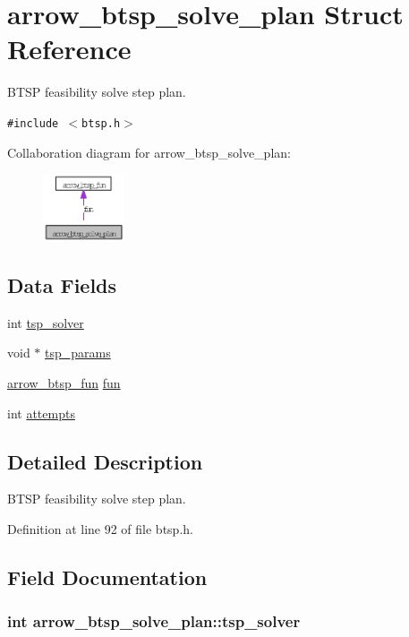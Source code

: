 \hypertarget{structarrow__btsp__solve__plan}{
\section{arrow\_\-btsp\_\-solve\_\-plan Struct Reference}
\label{structarrow__btsp__solve__plan}
}
BTSP feasibility solve step plan.  


{\tt \#include $<$btsp.h$>$}

Collaboration diagram for arrow\_\-btsp\_\-solve\_\-plan:\nopagebreak
\begin{figure}[H]
\begin{center}
\leavevmode
\includegraphics[width=68pt]{structarrow__btsp__solve__plan__coll__graph}
\end{center}
\end{figure}
\subsection*{Data Fields}
\begin{CompactItemize}
\item 
int \hyperlink{structarrow__btsp__solve__plan_911facf12673ddb5c3eb024fa12ee18d}{tsp\_\-solver}
\item 
void $\ast$ \hyperlink{structarrow__btsp__solve__plan_2b7cf65583f45c990218139dbae34ae5}{tsp\_\-params}
\item 
\hyperlink{structarrow__btsp__fun}{arrow\_\-btsp\_\-fun} \hyperlink{structarrow__btsp__solve__plan_89fa2ad1bcc026cd50fd7abc6c30ce3e}{fun}
\item 
int \hyperlink{structarrow__btsp__solve__plan_acfa3d4257a33548a9f60ee568219bc5}{attempts}
\end{CompactItemize}


\subsection{Detailed Description}
BTSP feasibility solve step plan. 

Definition at line 92 of file btsp.h.

\subsection{Field Documentation}
\hypertarget{structarrow__btsp__solve__plan_911facf12673ddb5c3eb024fa12ee18d}{
\subsubsection{\setlength{\rightskip}{0pt plus 5cm}int {\bf arrow\_\-btsp\_\-solve\_\-plan::tsp\_\-solver}}}
\label{structarrow__btsp__solve__plan_911facf12673ddb5c3eb024fa12ee18d}



